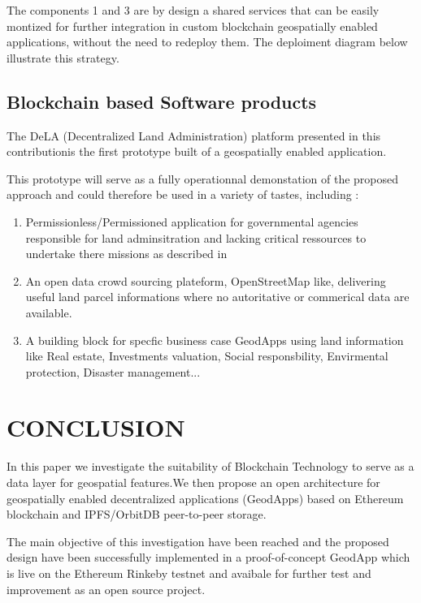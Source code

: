 \documentclass{isprs} %
\begin{document}
The components 1 and 3 are by design a shared services that can be easily montized for further integration in custom blockchain geospatially enabled applications, without the need to redeploy them. The deploiment diagram below illustrate this strategy.

\subsection{Blockchain based Software products}\label{sec:Blockchain based Software products}

The DeLA (Decentralized Land Administration) platform presented in this contributionis the first prototype built of a geospatially enabled application.

This prototype will serve as a fully operationnal demonstation of the proposed approach and could therefore be used in a variety of tastes, including :
\begin{enumerate}
\setlength\itemsep{0em}\setlength\parskip{0em}\setlength\topsep{0em}\setlength\partopsep{0em}\setlength\parsep{0em} 
\item{Permissionless/Permissioned application for governmental agencies responsible for land adminsitration and lacking critical ressources to undertake there missions as described in \cite{mckay2016voluntary}}
\item{An open data crowd sourcing plateform, OpenStreetMap like, delivering useful land parcel informations where no autoritative or commerical data are available.}
\item{A building block for specfic business case GeodApps using land information like Real estate, Investments valuation, Social responsbility, Envirmental protection, Disaster management...}
\end{enumerate}

\section{CONCLUSION}\label{sec:CONCLUSION}

In this paper we investigate the suitability of Blockchain Technology to serve as a data layer for geospatial features.We then propose an open architecture for geospatially enabled decentralized applications (GeodApps) based on Ethereum blockchain and IPFS/OrbitDB peer-to-peer storage.

The main objective of this investigation have been reached and the proposed design have been successfully implemented in a proof-of-concept GeodApp which is live on the Ethereum Rinkeby testnet and avaibale for further test and improvement as an open source project.
 
\end{document}
